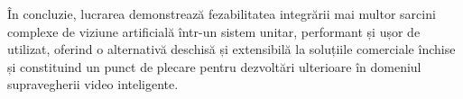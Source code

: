 \documentclass[../../main.tex]{subfiles}
\begin{document}
În concluzie, lucrarea demonstrează fezabilitatea integrării mai multor sarcini complexe de viziune artificială într-un sistem unitar, performant și ușor de utilizat, oferind o alternativă deschisă și extensibilă la soluțiile comerciale închise și constituind un punct de plecare pentru dezvoltări ulterioare în domeniul supravegherii video inteligente.
\end{document}
